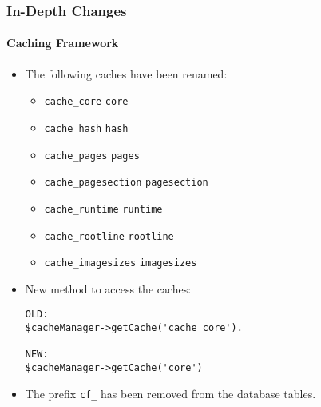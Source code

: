 \begin{frame}[fragile]
	\frametitle{In-Depth Changes}
	\framesubtitle{Caching Framework}

	\lstset{basicstyle=\tiny\ttfamily}

	\begin{itemize}
		\item The following caches have been renamed:

			\begin{itemize}\smaller
				\item \texttt{cache\_core} \textrightarrow\hspace{0.1cm}\texttt{core}
				\item \texttt{cache\_hash} \textrightarrow\hspace{0.1cm}\texttt{hash}
				\item \texttt{cache\_pages} \textrightarrow\hspace{0.1cm}\texttt{pages}
				\item \texttt{cache\_pagesection} \textrightarrow\hspace{0.1cm}\texttt{pagesection}
				\item \texttt{cache\_runtime} \textrightarrow\hspace{0.1cm}\texttt{runtime}
				\item \texttt{cache\_rootline} \textrightarrow\hspace{0.1cm}\texttt{rootline}
				\item \texttt{cache\_imagesizes} \textrightarrow\hspace{0.1cm}\texttt{imagesizes}
			\end{itemize}\normalsize

		\item New method to access the caches:
\begin{lstlisting}
OLD:
$cacheManager->getCache('cache_core').

NEW:
$cacheManager->getCache('core')
\end{lstlisting}

		\item The prefix \texttt{cf\_} has been removed from the database tables.
	\end{itemize}

\end{frame}


